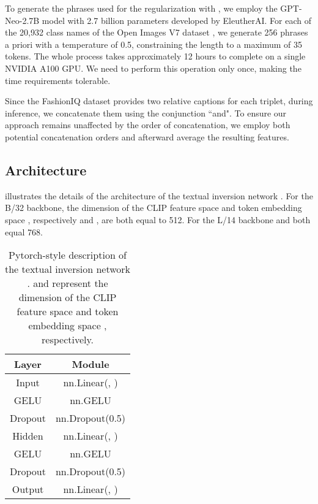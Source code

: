 \documentclass[10pt,twocolumn,letterpaper]{article}
\begin{document}
To generate the phrases used for the regularization with , we employ the GPT-Neo-2.7B model with 2.7 billion parameters developed by EleutherAI. For each of the 20,932 class names of the Open Images V7 dataset \cite{kuznetsova2020open}, we generate 256 phrases a priori with a temperature of 0.5, constraining the length to a maximum of 35 tokens. The whole process takes approximately 12 hours to complete on a single NVIDIA A100 GPU. We need to perform this operation only once, making the time requirements tolerable.

Since the FashionIQ dataset provides two relative captions for each triplet, during inference, we concatenate them using the conjunction ``and". To ensure our approach remains unaffected by the order of concatenation, we employ both potential concatenation orders and afterward average the resulting features.

\subsection{ Architecture}
 illustrates the details of the architecture of the textual inversion network . For the B/32 backbone, the dimension of the CLIP feature space and token embedding space , respectively  and , are both equal to 512. For the L/14 backbone  and  both equal 768. 

\begin{table}
    \centering
    \begin{tabular}{cc}
        Layer & Module \\ \midrule
        Input & nn.Linear(, ) \\
        GELU & nn.GELU \\
        Dropout & nn.Dropout(0.5) \\
        Hidden & nn.Linear(, ) \\
        GELU & nn.GELU \\
        Dropout & nn.Dropout(0.5) \\
        Output & nn.Linear(, ) \\ \bottomrule
    \end{tabular}
    \caption{Pytorch-style description of the textual inversion network .  and  represent the dimension of the CLIP feature space and token embedding space , respectively.}
    \vspace{-3ex}
    \label{tab:phi_architecture}
\end{table}
\end{document}
